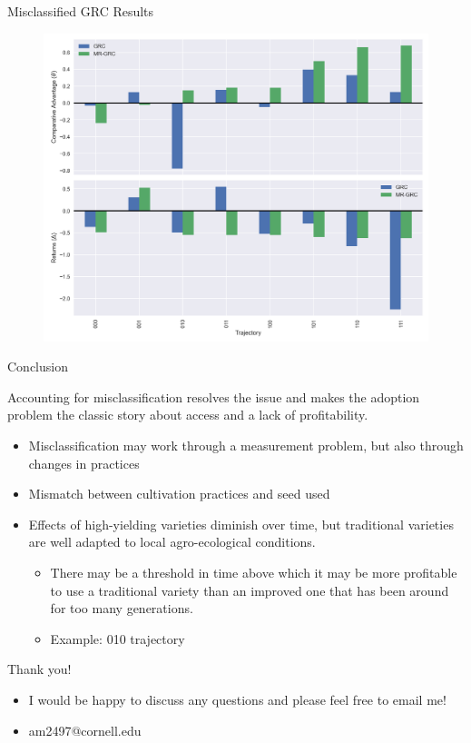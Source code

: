 \documentclass{beamer}
\begin{document}
\begin{frame}{Misclassified GRC Results}

\begin{figure}
    \centering
    \includegraphics[scale=0.4]{results/figures/mr-theta.png}
\end{figure}
\end{frame}

\begin{frame}{Conclusion}

Accounting for misclassification resolves the issue and makes the adoption problem the classic story about access and a lack of profitability.

\begin{itemize}
    \item Misclassification may work through a measurement problem, but also through changes in practices
    \item Mismatch between cultivation practices and seed used
    \item Effects of high-yielding varieties diminish over time, but traditional varieties are well adapted to local agro-ecological conditions.
    \begin{itemize}
    \item There may be a threshold in time above which it may be more profitable to use a traditional variety than an improved one that has been around for too many generations.
    \item Example: 010 trajectory
\end{itemize}
\end{itemize}

\end{frame}

\begin{frame}
Thank you!

\begin{itemize}
    \item I would be happy to discuss any questions and please feel free to email me!
    \item am2497@cornell.edu
\end{itemize}


    
\end{frame}


\end{document}
